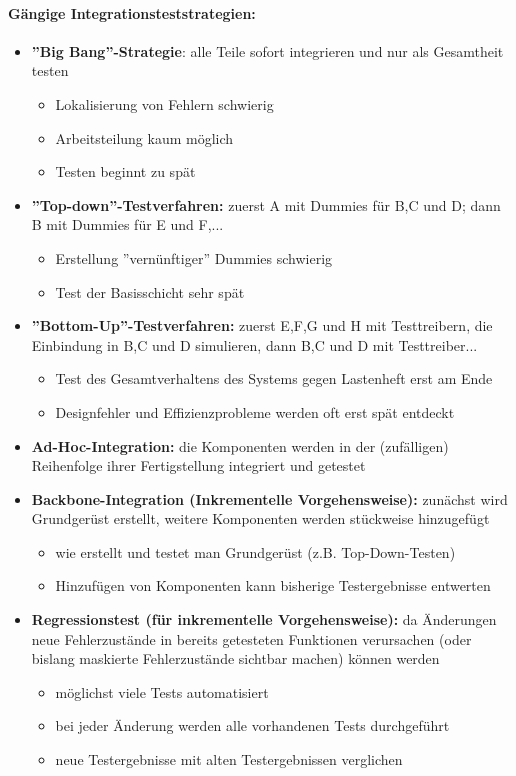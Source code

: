 \paragraph{Gängige Integrationsteststrategien:}
\begin{itemize}
	\item \textbf{''Big Bang''-Strategie}: alle Teile sofort integrieren und nur als Gesamtheit testen
	\begin{itemize}
		\item Lokalisierung von Fehlern schwierig
		\item Arbeitsteilung kaum möglich
		\item Testen beginnt zu spät
	\end{itemize}
	\item \textbf{''Top-down''-Testverfahren:} zuerst A mit Dummies für B,C und D; dann B mit Dummies für E und F,...
	\begin{itemize}
		\item Erstellung ''vernünftiger'' Dummies schwierig
		\item Test der Basisschicht sehr spät
	\end{itemize}
	\item \textbf{''Bottom-Up''-Testverfahren:} zuerst E,F,G und H mit Testtreibern, die Einbindung in B,C und D simulieren, dann B,C und D mit Testtreiber...
	\begin{itemize}
		\item Test des Gesamtverhaltens des Systems gegen Lastenheft erst am Ende
		\item Designfehler und Effizienzprobleme werden oft erst spät entdeckt
	\end{itemize}
	\item \textbf{Ad-Hoc-Integration:} die Komponenten werden in der (zufälligen) Reihenfolge ihrer Fertigstellung integriert und getestet
	\item \textbf{Backbone-Integration (Inkrementelle Vorgehensweise):} zunächst wird Grundgerüst erstellt, weitere Komponenten werden stückweise hinzugefügt
	\begin{itemize}
		\item wie erstellt und testet man Grundgerüst (z.B. Top-Down-Testen)
		\item Hinzufügen von Komponenten kann bisherige Testergebnisse entwerten
	\end{itemize}
	\item \textbf{Regressionstest (für inkrementelle Vorgehensweise):} da Änderungen neue Fehlerzustände in bereits getesteten Funktionen verursachen (oder bislang maskierte Fehlerzustände sichtbar machen) können werden
	\begin{itemize}
		\item möglichst viele Tests automatisiert
		\item bei jeder Änderung werden alle vorhandenen Tests durchgeführt
		\item neue Testergebnisse mit alten Testergebnissen verglichen
	\end{itemize}
\end{itemize}


